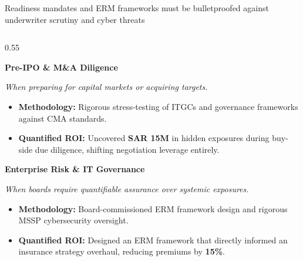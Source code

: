 \documentclass[aspectratio=169, 8pt]{beamer}
\begin{document}
\begin{frame}{Readiness mandates and ERM frameworks must be bulletproofed against underwriter scrutiny and cyber threats}
    \begin{columns}[T]
        \begin{column}{0.55\textwidth}
            \begin{tcolorbox}[colback=bcgLightGray, colframe=bcgLightGray, arc=0pt, left=2pt, top=1pt, bottom=1pt]
                \textbf{\small \color{bcgGreen} Pre-IPO \& M\&A Diligence}
            \end{tcolorbox}
            \textit{\scriptsize \color{gray} When preparing for capital markets or acquiring targets.}
            \begin{itemize}
                \setlength{\itemsep}{1pt}
                \setlength{\parskip}{0pt}
                \item \textbf{Methodology:} Rigorous stress-testing of ITGCs and governance frameworks against CMA standards.
                \item \textbf{\color{bcgGreen} Quantified ROI:} Uncovered \textbf{SAR 15M} in hidden exposures during buy-side due diligence, shifting negotiation leverage entirely.
            \end{itemize}
            
            \vspace{0.1cm}
            \begin{tcolorbox}[colback=bcgLightGray, colframe=bcgLightGray, arc=0pt, left=2pt, top=1pt, bottom=1pt]
                \textbf{\small \color{bcgGreen} Enterprise Risk \& IT Governance}
            \end{tcolorbox}
            \textit{\scriptsize \color{gray} When boards require quantifiable assurance over systemic exposures.}
            \begin{itemize}
                \setlength{\itemsep}{1pt}
                \setlength{\parskip}{0pt}
                \item \textbf{Methodology:} Board-commissioned ERM framework design and rigorous MSSP cybersecurity oversight.
                \item \textbf{\color{bcgGreen} Quantified ROI:} Designed an ERM framework that directly informed an insurance strategy overhaul, reducing premiums by \textbf{15\%}.
            \end{itemize}
        \end{column}
        

\end{columns}
\end{frame}
\end{document}
